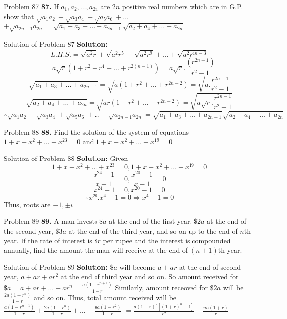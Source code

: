 \documentclass[aspectratio=1610,8pt]{beamer}
\begin{document}
\begin{frame}{Problem 87}
  \textbf{87.} If $a_1, a_2, \ldots, a_{2n}$ are $2n$ positive real numbers which are in G.P. show that $\sqrt{a_1a_2} +
  \sqrt{a_3a_4} + \sqrt{a_5a_6} + \ldots$ $ + \sqrt{a_{2n - 1}a_{2n}} = \sqrt{a_1 + a_3 + \ldots + a_{2n - 1}}\sqrt{a_2 + a_4 +
    \ldots + a_{2n}}$
\end{frame}
\begin{frame}{Solution of Problem 87}
  \textbf{Solution:} $$L.H.S. = \sqrt{a^2r} + \sqrt{a^2r^5} + \sqrt{a^2r^9} + \ldots + \sqrt{a^2r^{4n - 3}}$$
  $$= a\sqrt{r}(1 + r^2 + r^4 + \ldots + r^{2(n - 1)}) = a\sqrt{r}.\frac{(r^{2n - 1})}{r^2 - 1}$$
  $$\sqrt{a_1 + a_3 + \ldots + a_{2n - 1}} = \sqrt{a(1 + r^2 + \ldots + r^{2n - 2})} = \sqrt{a.\frac{r^{2n - 1}}{r^2 - 1}}$$
  $$\sqrt{a_2 + a_4 + \ldots + a_{2n}} = \sqrt{ar(1 + r^2 + \ldots + r^{2n - 2})} = \sqrt{a\sqrt{r}.\frac{r^{2n - 1}}{r^2 - 1}}$$
  $$\therefore \sqrt{a_1a_2} + \sqrt{a_3a_4} + \sqrt{a_5a_6} + \ldots + \sqrt{a_{2n - 1}a_{2n}} = \sqrt{a_1 + a_3 + \ldots +
    a_{2n - 1}}\sqrt{a_2 + a_4 + \ldots + a_{2n}}$$
\end{frame}
\begin{frame}{Problem 88}
  \textbf{88.} Find the solution of the system of equations $1 + x + x^2 + \ldots + x^{23} = 0$ and $1 + x + x^2 + \ldots + x^{19}
  = 0$
\end{frame}
\begin{frame}{Solution of Problem 88}
  \textbf{Solution:} Given $$1 + x + x^2 + \ldots + x^{23} = 0, 1 + x + x^2 + \ldots + x^{19} = 0$$
  $$\frac{x^{24} - 1}{x - 1} = 0, \frac{x^{20} - 1}{x - 1} = 0$$
  $$x^{24} - 1 = 0, x^{20} - 1 = 0$$
  $$\therefore x^{20}.x^4 - 1 = 0 \Rightarrow x^4 - 1 = 0$$
  Thus, roots are $-1, \pm i$
\end{frame}
\begin{frame}{Problem 89}
  \textbf{89.} A man invests $\$a$ at the end of the first year, $\$2a$ at the end of the second year, $\$3a$ at the end of the
  third year, and so on up to the end of $n$th year. If the rate of interest is $\$r$ per rupee and the interest is compounded
  annually, find the amount the man will receive at the end of $(n + 1)$th year.
\end{frame}
\begin{frame}{Solution of Problem 89}
  \textbf{Solution:} $\$a$ will become $a + ar$ at the end of second year, $a + ar + ar^2$ at the end of third year and so on. So
  amount received for $\$a = a + ar + \ldots + ar^n = \frac{a(1 - r^{n + 1})}{1 - r}$
  \linebreak\linebreak
  Similarly, amount receoved for $\$2a$ will be $\frac{2a(1 - r^{n})}{1 - r}$ and so on.
  \linebreak\linebreak
  Thus, total amount received will be $\frac{a(1 - r^{n + 1})}{1 - r} + \frac{2a(1 - r^{n})}{1 - r} + \ldots + \frac{na(1 - r^2)}{1
    - r}$
  \linebreak\linebreak
  $= \frac{a(1 + r)^2[(1 + r)^n - 1]}{r^2} - \frac{na(1 + r)}{r}$
\end{frame}
\end{document}
